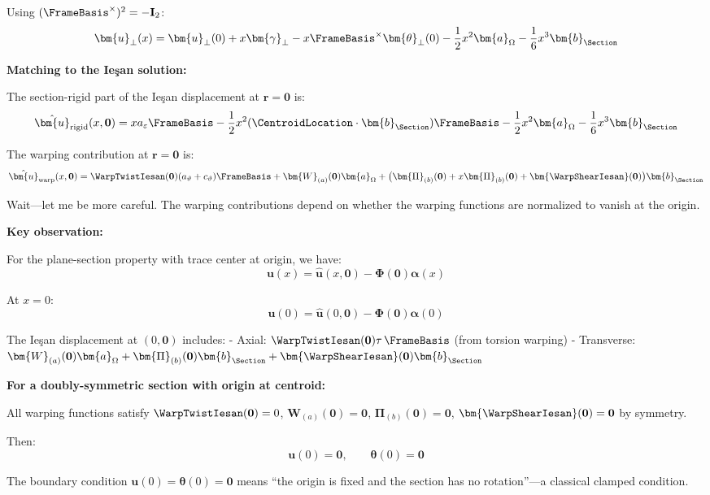 Using \((\FrameBasis^\times)^2 = -\mathbf{I}_2\):
\[\bm{u}_\perp(x) = \bm{u}_\perp(0) + x\bm{\gamma}_\perp - x\FrameBasis^\times\bm{\theta}_\perp(0) - \frac{1}{2}x^2\bm{a}_\Omega - \frac{1}{6}x^3\bm{b}_{\Section}\]

\textbf{Matching to the Ieşan solution:}

The section-rigid part of the Ieşan displacement at \(\bm{r} = \mathbf{0}\)
is:
\[\hat{\bm{u}}_{\rm rigid}(x, \mathbf{0}) = xa_\varepsilon\FrameBasis - \frac{1}{2}x^2(\CentroidLocation \cdot \bm{b}_{\Section})\FrameBasis - \frac{1}{2}x^2\bm{a}_\Omega - \frac{1}{6}x^3\bm{b}_{\Section}\]

The warping contribution at \(\bm{r} = \mathbf{0}\) is:
\[\hat{\bm{u}}_{\rm warp}(x, \mathbf{0}) = \WarpTwistIesan(\mathbf{0})(a_\vartheta + c_\vartheta)\FrameBasis + \bm{W}_{(a)}(\mathbf{0})\bm{a}_\Omega + \big(\bm{\Pi}_{(b)}(\mathbf{0}) + x\bm{\Pi}_{(b)}(\mathbf{0}) + \bm{\WarpShearIesan}(\mathbf{0})\big)\bm{b}_{\Section}\]

Wait---let me be more careful. The warping contributions depend on
whether the warping functions are normalized to vanish at the origin.

\textbf{Key observation:}

For the plane-section property with trace center at origin, we have:
\[\bm{u}(x) = \hat{\bm{u}}(x, \mathbf{0}) - \bm{\Phi}(\mathbf{0})\bm{\alpha}(x)\]

At \(x = 0\):
\[\bm{u}(0) = \hat{\bm{u}}(0, \mathbf{0}) - \bm{\Phi}(\mathbf{0})\bm{\alpha}(0)\]

The Ieşan displacement at \((0, \mathbf{0})\) includes: - Axial:
\(\WarpTwistIesan(\mathbf{0})\tau\,\FrameBasis\) (from torsion warping) -
Transverse:
\(\bm{W}_{(a)}(\mathbf{0})\bm{a}_\Omega + \bm{\Pi}_{(b)}(\mathbf{0})\bm{b}_{\Section} + \bm{\WarpShearIesan}(\mathbf{0})\bm{b}_{\Section}\)

\textbf{For a doubly-symmetric section with origin at centroid:}

All warping functions satisfy \(\WarpTwistIesan(\mathbf{0}) = 0\),
\(\bm{W}_{(a)}(\mathbf{0}) = \mathbf{0}\), \(\bm{\Pi}_{(b)}(\mathbf{0}) = \mathbf{0}\),
\(\bm{\WarpShearIesan}(\mathbf{0}) = \mathbf{0}\) by symmetry.

Then: \[\bm{u}(0) = \mathbf{0}, \qquad \bm{\theta}(0) = \mathbf{0}\]

The boundary condition \(\bm{u}(0) = \bm{\theta}(0) = \mathbf{0}\) means
``the origin is fixed and the section has no rotation''---a classical
clamped condition.

